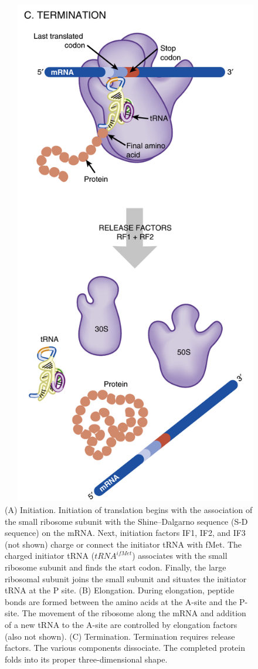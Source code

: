 \documentclass[11pt,ignorenonframetext,aspectratio=169]{beamer}
\begin{document}
\begin{frame}{}
\begin{figure}
\begin{columns}[T,onlytextwidth]
\begin{center}
  \end{center}
  \begin{center}
  \includegraphics[width=0.62\linewidth]{../images/translation_prokaryotes_termination.png}
  \end{center}
  \end{columns}
  \caption{(A) Initiation. Initiation of translation begins with the association of the small ribosome subunit with the Shine–Dalgarno sequence (S-D sequence) on the mRNA. Next, initiation factors IF1, IF2, and IF3 (not shown) charge or connect the initiator tRNA with fMet. The charged initiator tRNA ($tRNA^{ifMet}$) associates with the small ribosome subunit and finds the start codon. Finally, the large ribosomal subunit joins the small subunit and situates the initiator tRNA at the P site. (B) Elongation. During elongation, peptide bonds are formed between the amino acids at the A-site and the P-site. The movement of the ribosome along the mRNA and addition of a new tRNA to the A-site are controlled by elongation factors (also not shown). (C) Termination. Termination requires release factors. The various components dissociate. The completed protein folds into its proper three-dimensional shape.}
  \label{fig:translation-prokaryotes}
\end{figure}
\end{frame}
\end{document}
